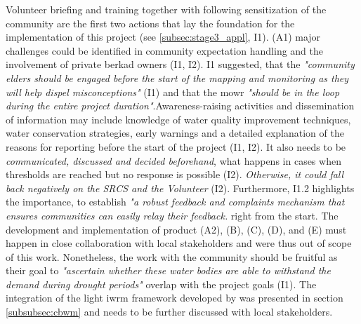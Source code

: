 Volunteer briefing and training together with following sensitization of the community are the first two actions that lay the foundation for the implementation of this project (see \ref*{subsec:stage3_appl}, I1). (A1) major challenges could be identified in community expectation handling and the involvement of private berkad owners (I1, I2). I1 suggested, that the \textit{"community elders should be engaged before the start of the mapping and monitoring as they will help dispel misconceptions"} (I1) and that the \acrshort{mowr} \textit{"should be in the loop during the entire project duration"}.Awareness-raising activities and dissemination of information may include knowledge of water quality improvement techniques, water conservation strategies, early warnings and a detailed explanation of the reasons for reporting before the start of the project (I1, I2). It also needs to be \textit{communicated, discussed and decided beforehand},  what happens in cases when thresholds are reached but no response is possible (I2). \textit{Otherwise, it could fall back negatively on the SRCS and the Volunteer} (I2). Furthermore, I1.2 highlights the importance, to establish \textit{"a robust feedback and complaints mechanism that ensures communities can easily relay their feedback.} right from the start. The development and implementation of product (A2), (B), (C), (D), and (E) must happen in close collaboration with local stakeholders and were thus out of scope of this work. Nonetheless, the work with the community should be fruitful as their goal to \textit{"ascertain whether these water bodies are able to withstand the demand during drought periods"} overlap with the project goals (I1).\newline
The integration of the light \acrshort{iwrm} framework developed by \autocite{dayCommunitybasedWaterResources2009} was presented in section \ref*{subsubsec:cbwm} and needs to be further discussed with local stakeholders.




